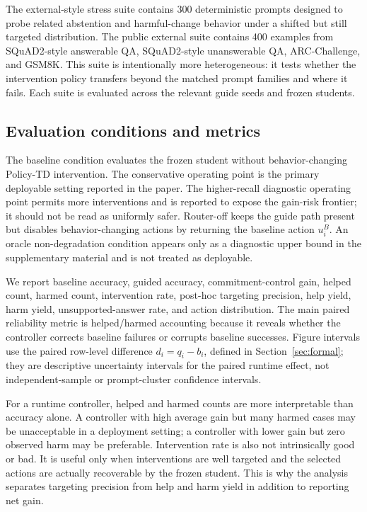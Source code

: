 \documentclass[11pt]{article}
\newcommand{\policytd}{Policy-TD}
\begin{document}
The external-style stress suite contains 300 deterministic prompts designed to probe related abstention and harmful-change behavior under a shifted but still targeted distribution. The public external suite contains 400 examples from SQuAD2-style answerable QA, SQuAD2-style unanswerable QA, ARC-Challenge, and GSM8K. This suite is intentionally more heterogeneous: it tests whether the intervention policy transfers beyond the matched prompt families and where it fails. Each suite is evaluated across the relevant guide seeds and frozen students.

\subsection{Evaluation conditions and metrics}
The baseline condition evaluates the frozen student without behavior-changing \policytd{} intervention. The conservative operating point is the primary deployable setting reported in the paper. The higher-recall diagnostic operating point permits more interventions and is reported to expose the gain-risk frontier; it should not be read as uniformly safer. Router-off keeps the guide path present but disables behavior-changing actions by returning the baseline action \(u_i^B\). An oracle non-degradation condition appears only as a diagnostic upper bound in the supplementary material and is not treated as deployable.

We report baseline accuracy, guided accuracy, commitment-control gain, helped count, harmed count, intervention rate, post-hoc targeting precision, help yield, harm yield, unsupported-answer rate, and action distribution. The main paired reliability metric is helped/harmed accounting because it reveals whether the controller corrects baseline failures or corrupts baseline successes. Figure intervals use the paired row-level difference \(d_i=q_i-b_i\), defined in Section~\ref{sec:formal}; they are descriptive uncertainty intervals for the paired runtime effect, not independent-sample or prompt-cluster confidence intervals.

For a runtime controller, helped and harmed counts are more interpretable than accuracy alone. A controller with high average gain but many harmed cases may be unacceptable in a deployment setting; a controller with lower gain but zero observed harm may be preferable. Intervention rate is also not intrinsically good or bad. It is useful only when interventions are well targeted and the selected actions are actually recoverable by the frozen student. This is why the analysis separates targeting precision from help and harm yield in addition to reporting net gain.
\end{document}
